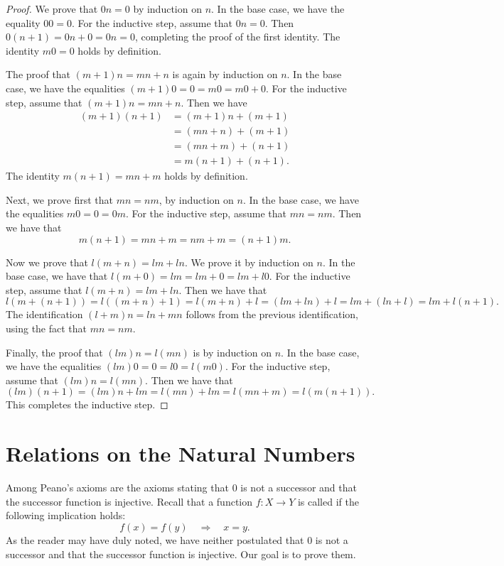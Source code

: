 \begin{proof}
  We prove that $0n=0$ by induction on $n$. In the base case, we have the equality $00=0$. For the inductive step, assume that $0n=0$. Then $0(n+1)=0n+0=0n=0$, completing the proof of the first identity. The identity $m0=0$ holds by definition.

  The proof that $(m+1)n=mn+n$ is again by induction on $n$. In the base case, we have the equalities $(m+1)0=0=m0=m0+0$. For the inductive step, assume that $(m+1)n=mn+n$. Then we have
  \begin{align*}
    (m+1)(n+1)
    & = (m+1)n+(m+1) \\
    & = (mn+n)+(m+1) \\
    & = (mn+m)+(n+1) \\
    & = m(n+1)+(n+1).
  \end{align*}
  The identity $m(n+1)=mn+m$ holds by definition.

  Next, we prove first that $mn=nm$, by induction on $n$. In the base case, we have the equalities $m0=0=0m$. For the inductive step, assume that $mn=nm$. Then we have that
  \begin{equation*}
    m(n+1)=mn+m=nm+m=(n+1)m.
  \end{equation*}

  Now we prove that $l(m+n)=lm+ln$. We prove it by induction on $n$. In the base case, we have that $l(m+0)=lm=lm+0= lm+l0$. For the inductive step, assume that $l(m+n)=lm+ln$. Then we have that
  \begin{equation*}
    l(m+(n+1))=l((m+n)+1)=l(m+n)+l=(lm+ln)+l=lm+(ln+l)=lm+l(n+1).
  \end{equation*}
  The identification $(l+m)n=ln+mn$ follows from the previous identification, using the fact that $mn=nm$.

  Finally, the proof that $(lm)n=l(mn)$ is by induction on $n$. In the base case, we have the equalities $(lm)0=0=l0=l(m0)$. For the inductive step, assume that $(lm)n=l(mn)$. Then we have that
  \begin{equation*}
    (lm)(n+1)= (lm)n+lm=l(mn)+lm=l(mn+m)=l(m(n+1)).
  \end{equation*}
  This completes the inductive step.
\end{proof}

\section{Relations on the Natural Numbers}

Among Peano's axioms are the axioms stating that $0$ is not a successor and that the successor function is injective. Recall that a function $f:X\to Y$ is called  if the following implication holds:
\begin{equation*}
  f(x)=f(y)\quad\Rightarrow\quad x=y.
\end{equation*}
As the reader may have duly noted, we have neither postulated that $0$ is not a successor and that the successor function is injective. Our goal is to prove them.

